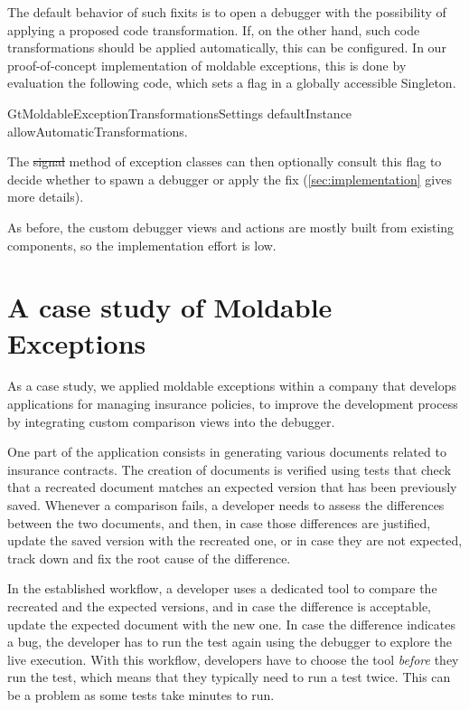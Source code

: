 \documentclass[sigplan,anonymous,review,10pt]{acmart}
\begin{document}
The default behavior of such fixits is to open a debugger with the possibility of applying a proposed code transformation.
If, on the other hand, such code transformations should be applied automatically, this can be configured.
In our proof-of-concept implementation of moldable exceptions, this is done by evaluation the following code, which sets a flag in a globally accessible Singleton.
\begin{code}
GtMoldableExceptionTransformationsSettings defaultInstance allowAutomaticTransformations.
\end{code}
The \st{signal} method of exception classes can then optionally consult this flag to decide whether to spawn a debugger or apply the fix (\autoref{sec:implementation} gives more details).

As before, the custom debugger views and actions are mostly built from existing components, so the implementation effort is low.

\section{A case study of Moldable Exceptions}\label{sec:casestudy}

As a case study, we applied moldable exceptions within a company that develops applications for managing insurance policies, to improve the development process by integrating custom comparison views into the debugger.

One part of the application consists in generating various documents related to insurance contracts.
The creation of documents is verified using tests that check that a recreated document matches an expected version that has been previously saved.
Whenever a comparison fails, a developer needs to assess the differences between the two documents, and then, in case those differences are justified, update the saved version with the recreated one, or in case they are not expected, track down and fix the root cause of the difference.

In the established workflow, a developer uses a dedicated tool to compare the recreated and the expected versions, and in case the difference is acceptable, update the expected document with the new one.
In case the difference indicates a bug, the developer has to run the test again using the debugger to explore the live execution.
With this workflow, developers have to choose the tool \emph{before} they run the test, which means that they typically need to run a test twice.
This can be a problem as some tests take minutes to run.
\end{document}
